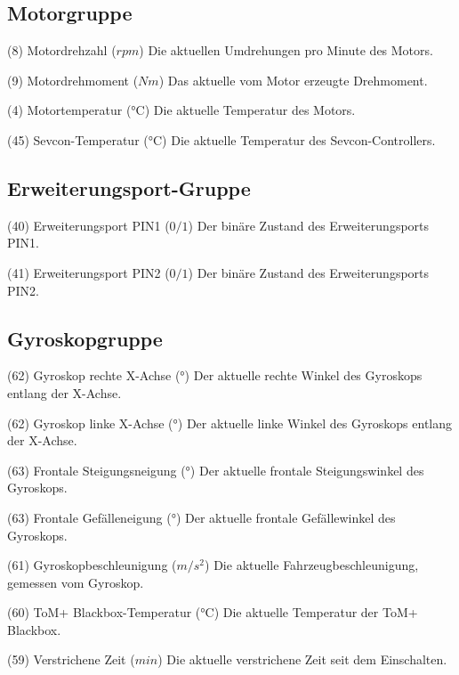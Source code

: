 \subsection{Motorgruppe}

{(8) Motordrehzahl (\(rpm\))}
{Die aktuellen Umdrehungen pro Minute des Motors.}

{(9) Motordrehmoment (\(Nm\))}
{Das aktuelle vom Motor erzeugte Drehmoment.}

{(4) Motortemperatur (°C)}
{Die aktuelle Temperatur des Motors.}

{(45) Sevcon-Temperatur (°C)}
{Die aktuelle Temperatur des Sevcon-Controllers.}

\subsection{Erweiterungsport-Gruppe}

{(40) Erweiterungsport PIN1 (\(0/1\))}
{Der binäre Zustand des Erweiterungsports PIN1.}

{(41) Erweiterungsport PIN2 (\(0/1\))}
{Der binäre Zustand des Erweiterungsports PIN2.}

\subsection{Gyroskopgruppe}

{(62) Gyroskop rechte X-Achse (°)}
{Der aktuelle rechte Winkel des Gyroskops entlang der X-Achse.}

{(62) Gyroskop linke X-Achse (°)}
{Der aktuelle linke Winkel des Gyroskops entlang der X-Achse.}

{(63) Frontale Steigungsneigung (°)}
{Der aktuelle frontale Steigungswinkel des Gyroskops.}

{(63) Frontale Gefälleneigung (°)}
{Der aktuelle frontale Gefällewinkel des Gyroskops.}

{(61) Gyroskopbeschleunigung (\(m/s^2\))}
{Die aktuelle Fahrzeugbeschleunigung, gemessen vom Gyroskop.}

{(60) ToM+ Blackbox-Temperatur (°C)}
{Die aktuelle Temperatur der ToM+ Blackbox.}

{(59) Verstrichene Zeit (\(min\))}
{Die aktuelle verstrichene Zeit seit dem Einschalten.}

